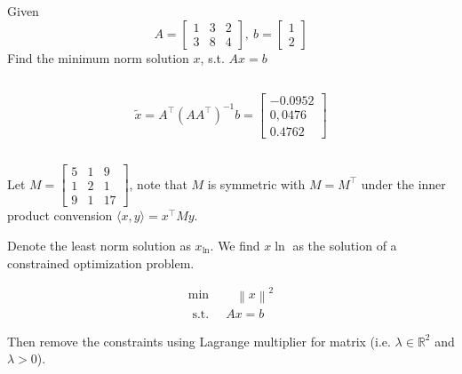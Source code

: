 \documentclass{article}
\theoremstyle{definition} %
\newcommand{\RR}{\mathbb{R}}
\begin{document}
\section{}
Given 
$$
A=\left[\begin{array}{lll}
1 & 3 & 2 \\
3 & 8 & 4
\end{array}\right],\ b=\left[\begin{array}{l}
1 \\
2
\end{array}\right]
$$
Find the minimum norm solution $x$, s.t. $A x=b$

\subsection{}

$$
\tilde{x}=A^{\top}\left(A A^{\top}\right)^{-1} b=
\left[\begin{array}{c}
	-0.0952 \\ 0,0476 \\ 0.4762
\end{array}\right]
$$

\subsection{}
Let $M=\left[\begin{array}{lll}5 & 1 & 9 \\ 1 & 2 & 1 \\ 9 & 1 & 17\end{array}\right]$, note that $M$ is symmetric with $M=M^{\top}$ under the inner product convension $\langle x, y\rangle=x^{\top} M y$.

Denote the least norm solution as $x_{\ln}$. We find $x{\ln}$ as the solution of a constrained optimization problem.

\begin{align*}
	\min &\quad \left\|x\right\|^2 \\
	\text { s.t. } &\ A x=b
\end{align*}

Then remove the constraints using Lagrange multiplier for matrix (i.e. $\lambda \in \RR^{2}$ and $\lambda > 0$).
\end{document}
